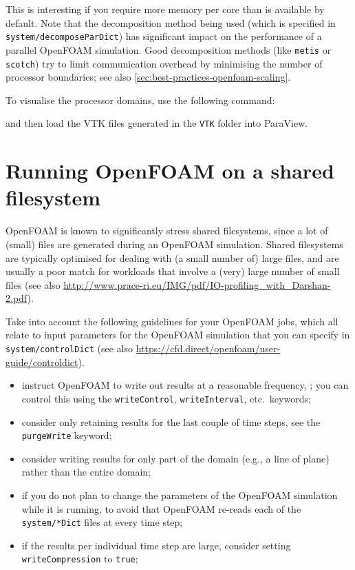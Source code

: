 This is interesting if you require more memory per core than is available by default.
Note that the decomposition method being used (which is specified in \lstinline|system/decomposeParDict|)
has significant impact on the performance of a parallel OpenFOAM simulation. Good decomposition methods (like
\lstinline|metis| or \lstinline|scotch|) try to limit communication overhead by minimising the number
of processor boundaries; see also \autoref{sec:best-practices-openfoam-scaling}.

To visualise the processor domains, use the following command:

\begin{prompt}
\end{prompt}

and then load the VTK files generated in the \lstinline|VTK| folder into ParaView.

\section{Running OpenFOAM on a shared filesystem}
\label{sec:best-practices-openfoam-shared-filesystems}

OpenFOAM is known to significantly stress shared filesystems, since a lot of (small) files are generated
during an OpenFOAM simulation. Shared filesystems are typically optimised for dealing with (a small number of)
large files, and are usually a poor match for workloads that involve a (very) large number of small files
(see also \url{http://www.prace-ri.eu/IMG/pdf/IO-profiling_with_Darshan-2.pdf}).

Take into account the following guidelines for your OpenFOAM jobs, which all relate to input parameters
for the OpenFOAM simulation that you can specify in \lstinline|system/controlDict|
(see also \url{https://cfd.direct/openfoam/user-guide/controldict}).

\begin{itemize}
\item instruct OpenFOAM to write out results at a reasonable frequency, ; you can control this using the \lstinline|writeControl|,
    \lstinline|writeInterval|, etc.\ keywords;
\item consider only retaining results for the last couple of time steps, see the \lstinline|purgeWrite| keyword;
\item consider writing results for only part of the domain (e.g., a line of plane) rather than the entire domain;
\item if you do not plan to change the parameters of the OpenFOAM simulation while it is running,
       to avoid that OpenFOAM re-reads
      each of the \lstinline|system/*Dict| files at every time step;
\item if the results per individual time step are large, consider setting \lstinline|writeCompression| to
      \lstinline|true|;
\end{itemize}


